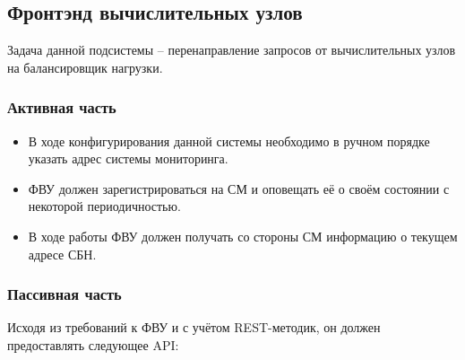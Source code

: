 \documentclass[a4paper,12pt]{report}
\numberwithin{equation}{section}
\begin{document}
\subsection{Фронтэнд вычислительных узлов}
Задача данной подсистемы -- перенаправление запросов от вычислительных узлов на балансировщик нагрузки.

\subsubsection{Активная часть}
\begin{itemize}
  \item В ходе конфигурирования данной системы необходимо в ручном порядке указать адрес системы мониторинга.
  \item ФВУ должен зарегистрироваться на СМ и оповещать её о своём состоянии с некоторой периодичностью.
  \item В ходе работы ФВУ должен получать со стороны СМ информацию о текущем адресе СБН.
\end{itemize}

\subsubsection{Пассивная часть}
Исходя из требований к ФВУ и с учётом REST-методик, он должен предоставлять следующее API:
\end{document}
